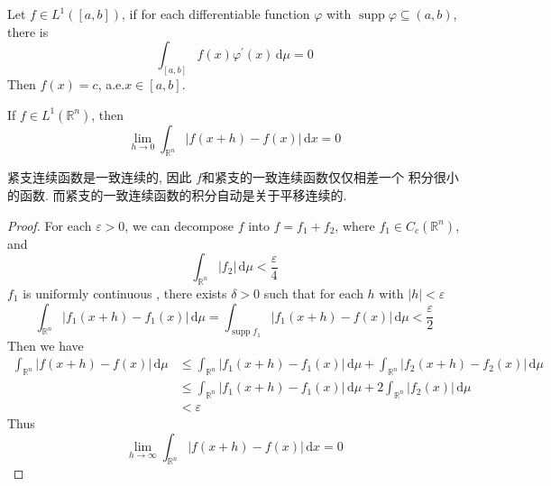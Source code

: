\documentclass[../main.tex]{subfiles}
\begin{document}
\begin{proposition}{}{}
    Let \(  f\in L^{1}\left( [a,b] \right)   \), if for each differentiable function \(   \varphi   \) with \(  \operatorname{supp} \varphi \subseteq \left( a,b \right)   \), there is \[
    \int_{[a,b]} f\left( x \right) \varphi ^{\prime} \left( x \right)\,\mathrm{d} \mu = 0  
    \]Then \(  f\left( x \right)=  c   \), a.e.\(  x\in \left[ a,b \right]   \).  
\end{proposition}

\begin{theorem}{}{}
    If \(  f\in L^{1}\left( \mathbb{R}^{n} \right)   \), then \[
    \lim_{h\to 0}\int_{\mathbb{R}^{n}}\left| f\left( x+ h \right)-f\left( x \right)   \right|\,\mathrm{d} x= 0 
    \] 
\end{theorem}

\begin{proofsketch}
    紧支连续函数是一致连续的, 因此 \(  f  \)和紧支的一致连续函数仅仅相差一个 积分很小的函数.  而紧支的一致连续函数的积分自动是关于平移连续的.
\end{proofsketch}

\begin{proof}
     For each \(   \varepsilon > 0  \), we can decompose \(  f  \) into \(  f= f_1+ f_2  \), where \(  f_1\in C_{c}\left( \mathbb{R}^{n} \right)   \), and \[
     \int_{\mathbb{R}^{n}}\left| f_2 \right|\,\mathrm{d} \mu < \frac{ \varepsilon  }{4 }  
     \]    \(  f_1  \) is uniformly continuous , there exists \(   \delta > 0  \) such that  for each \(  h  \) with \(  \left| h \right|<  \varepsilon    \)  \[
     \int_{\mathbb{R}^{n}}\left| f_1\left( x+ h \right)-f_1\left( x \right)   \right|\,\mathrm{d} \mu = \int_{\operatorname{supp}f_1}\left| f_1\left( x+ h \right)-f\left( x \right)   \right|\,\mathrm{d} \mu  < \frac{ \varepsilon  }{2 }  
     \]  Then we have \begin{equation}
        \begin{aligned}
            \int_{\mathbb{R}^{n}}\left| f\left( x+ h \right)-f\left( x \right)   \right|\,\mathrm{d} \mu &\le  \int_{\mathbb{R}^{n}}\left| f_1\left( x+ h \right)-f_1\left( x \right)   \right|\,\mathrm{d} \mu + \int_{\mathbb{R}^{n}}\left| f_2\left( x+ h \right)-f_2\left( x \right)   \right|\,\mathrm{d} \mu \\ 
             &\le \int_{\mathbb{R}^{n}}\left| f_1\left( x+ h \right)-f_1\left( x\right)   \right|\,\mathrm{d} \mu  + 2 \int_{\mathbb{R}^{n}}\left| f_2\left( x \right)  \right|\,\mathrm{d} \mu \\ 
              &<  \varepsilon 
        \end{aligned}
     \end{equation}
    Thus \[
    \lim_{h\to \infty} \int_{\mathbb{R}^{n}}\left| f\left( x+ h \right)-f\left( x \right)   \right|\,\mathrm{d} x= 0 
    \]
\end{proof}
\end{document}
